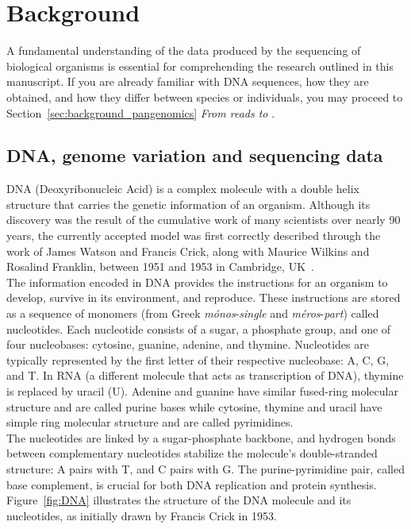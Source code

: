 \chapter{Background}
\label{sec:background}
A fundamental understanding of the data produced by the sequencing of biological organisms is essential for comprehending the research outlined in this manuscript. If you are already familiar with DNA sequences, how they are obtained, and how they differ between species or individuals, you may proceed to Section~\ref{sec:background_pangenomics} \emph{From reads to \kmers}.
\section{DNA, genome variation and sequencing data}
\label{sec:dna}
\gls{DNA} (Deoxyribonucleic Acid) is a complex molecule with a double helix structure that carries the genetic information of an organism. Although its discovery was the result of the cumulative work of many scientists over nearly 90 years, the currently accepted model was first correctly described through the work of James Watson and Francis Crick, along with Maurice Wilkins and Rosalind Franklin, between 1951 and 1953 in Cambridge, UK~\cite{franklin}.\\
The information encoded in DNA provides the instructions for an organism to develop, survive in its environment, and reproduce. These instructions are stored as a sequence of monomers (from Greek \emph{mónos}-\emph{single} and \emph{méros}-\emph{part}) called nucleotides. Each nucleotide consists of a sugar, a phosphate group, and one of four nucleobases: cytosine, guanine, adenine, and thymine. Nucleotides are typically represented by the first letter of their respective nucleobase: A, C, G, and T. In \gls{RNA} (a different molecule that acts as transcription of DNA), thymine is replaced by uracil (U). Adenine and guanine have similar fused-ring molecular structure and are called purine bases while cytosine, thymine and uracil have simple ring molecular structure and are called pyrimidines.\\
The nucleotides are linked by a sugar-phosphate backbone, and hydrogen bonds between complementary nucleotides stabilize the molecule's double-stranded structure: A pairs with T, and C pairs with G. The purine-pyrimidine pair, called base complement, is crucial for both DNA replication and protein synthesis. Figure~\ref{fig:DNA} illustrates the structure of the DNA molecule and its nucleotides, as initially drawn by Francis Crick in 1953.
